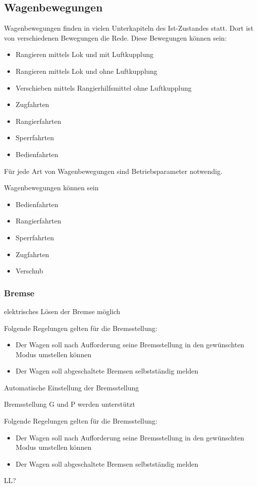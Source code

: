 \subsection{Wagenbewegungen}

Wagenbewegungen finden in vielen Unterkapiteln des Ist-Zustandes statt. Dort ist von verschiedenen Bewegungen die Rede. Diese Bewegungen können sein:
\begin{itemize}
    \item Rangieren mittels Lok und mit Luftkupplung
    \item Rangieren mittels Lok und ohne Luftkupplung
    \item Verschieben mittels Rangierhilfsmittel ohne Luftkupplung
    \item Zugfahrten
    \item Rangierfahrten
    \item Sperrfahrten
    \item Bedienfahrten
\end{itemize}
\begin{feat}
Für jede Art von Wagenbewegungen sind Betriebsparameter notwendig.
\end{feat}
\begin{rem}
Wagenbewegungen können sein
\begin{itemize}
    \item Bedienfahrten
    \item Rangierfahrten
    \item Sperrfahrten
    \item Zugfahrten
    \item Verschub
\end{itemize}
\end{rem}

\subsubsection{Bremse}
\begin{feat}
elektrisches Lösen der Bremse möglich
\end{feat}
Folgende Regelungen gelten für die Bremsstellung:
\begin{itemize}
    \item Der Wagen soll nach Aufforderung seine Bremsstellung in den gewünschten Modus umstellen können
    \item Der Wagen soll abgeschaltete Bremsen selbstständig melden
\end{itemize}
\begin{feat}
Automatische Einstellung der Bremsstellung
\end{feat}
\begin{rem}
Bremsstellung G und P werden unterstützt
\end{rem}
\begin{rem}
Folgende Regelungen gelten für die Bremsstellung:
\begin{itemize}
    \item Der Wagen soll nach Aufforderung seine Bremsstellung in den gewünschten Modus umstellen können
    \item Der Wagen soll abgeschaltete Bremsen selbstständig melden
\end{itemize}
\end{rem}
LL?


